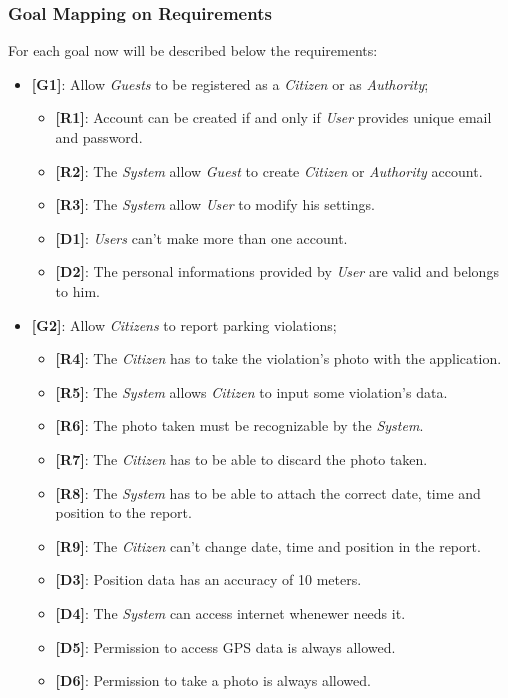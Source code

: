 \documentclass{article}
\begin{document}
\subsubsection{Goal Mapping on Requirements}
For each goal now will be described below the requirements:
\begin{itemize}
    \item \textbf{[G1]}: Allow \textit{Guests} to be registered as a \textit{Citizen} or as \textit{Authority};
    \begin{itemize}
        \item \textbf{[R1]}: Account can be created if and only if \textit{User} provides unique email and password.
        \item \textbf{[R2]}: The \textit{System} allow \textit{Guest} to create \textit{Citizen} or \textit{Authority} account.
        \item \textbf{[R3]}:  The \textit{System} allow \textit{User} to modify his settings. 
        \item \textbf{[D1]}: \textit{Users} can't make more than one account.
        \item \textbf{[D2]}: The personal informations provided by \textit{User} are valid and belongs to him. 
    \end{itemize}

    \item \textbf{[G2]}: Allow \textit{Citizens} to report parking violations;
    \begin{itemize}
        \item \textbf{[R4]}: The \textit{Citizen} has to take the violation's photo with the application. 
        \item \textbf{[R5]}: The \textit{System} allows \textit{Citizen} to input some violation's data.
        \item \textbf{[R6]}: The photo taken must be recognizable by the \textit{System}.  
        \item \textbf{[R7]}: The \textit{Citizen} has to be able to discard the photo taken.
        \item \textbf{[R8]}: The \textit{System} has to be able to attach the correct date, time and position to the report.
        \item \textbf{[R9]}: The \textit{Citizen} can't change date, time and position in the report.
        \item \textbf{[D3]}: Position data has an accuracy of 10 meters.
        \item \textbf{[D4]}: The \textit{System} can access internet whenewer needs it.
        \item \textbf{[D5]}: Permission to access GPS data is always allowed.
        \item \textbf{[D6]}: Permission to take a photo is always allowed. 
    \end{itemize}


\end{itemize}
\end{document}
